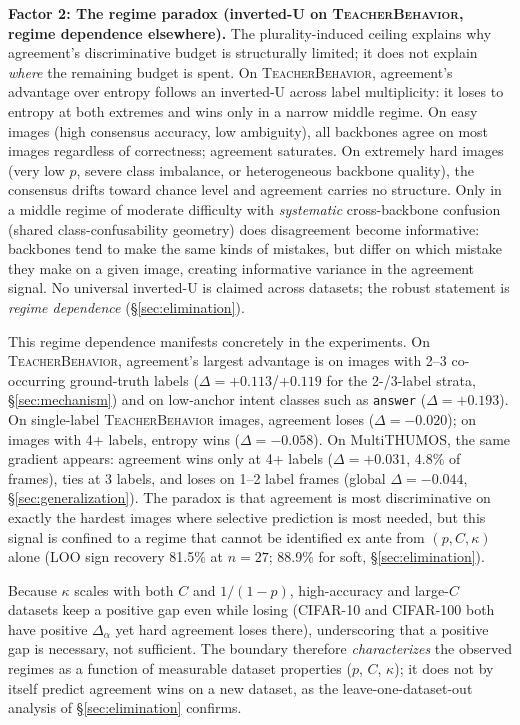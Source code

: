 \documentclass[a4paper,fleqn]{cas-sc}
\newcommand{\tb}{\textsc{TeacherBehavior}}
\begin{document}
\textbf{Factor 2: The regime paradox (inverted-U on \tb, regime dependence elsewhere).}
The plurality-induced ceiling explains why agreement's discriminative budget is structurally limited; it does not explain \emph{where} the remaining budget is spent.
On \tb, agreement's advantage over entropy follows an inverted-U across label multiplicity: it loses to entropy at both extremes and wins only in a narrow middle regime.
On easy images (high consensus accuracy, low ambiguity), all backbones agree on most images regardless of correctness; agreement saturates.
On extremely hard images (very low $p$, severe class imbalance, or heterogeneous backbone quality), the consensus drifts toward chance level and agreement carries no structure.
Only in a middle regime of moderate difficulty with \emph{systematic} cross-backbone confusion (shared class-confusability geometry) does disagreement become informative: backbones tend to make the same kinds of mistakes, but differ on which mistake they make on a given image, creating informative variance in the agreement signal.
No universal inverted-U is claimed across datasets; the robust statement is \emph{regime dependence} (\S\ref{sec:elimination}).

This regime dependence manifests concretely in the experiments.
On \tb, agreement's largest advantage is on images with 2--3 co-occurring ground-truth labels ($\Delta = +0.113$/$+0.119$ for the 2-/3-label strata, \S\ref{sec:mechanism}) and on low-anchor intent classes such as \texttt{answer} ($\Delta = +0.193$).
On single-label \tb{} images, agreement loses ($\Delta = -0.020$); on images with 4+ labels, entropy wins ($\Delta = -0.058$).
On MultiTHUMOS, the same gradient appears: agreement wins only at 4+ labels ($\Delta = +0.031$, 4.8\% of frames), ties at 3 labels, and loses on 1--2 label frames (global $\Delta = -0.044$, \S\ref{sec:generalization}).
The paradox is that agreement is most discriminative on exactly the hardest images where selective prediction is most needed, but this signal is confined to a regime that cannot be identified ex ante from $(p, C, \kappa)$ alone (LOO sign recovery 81.5\% at $n{=}27$; 88.9\% for soft, \S\ref{sec:elimination}).

Because $\kappa$ scales with both $C$ and $1/(1-p)$, high-accuracy and large-$C$ datasets keep a positive gap even while losing (CIFAR-10 and CIFAR-100 both have positive $\Delta_\alpha$ yet hard agreement loses there), underscoring that a positive gap is necessary, not sufficient. The boundary therefore \emph{characterizes} the observed regimes as a function of measurable dataset properties ($p$, $C$, $\kappa$); it does not by itself predict agreement wins on a new dataset, as the leave-one-dataset-out analysis of \S\ref{sec:elimination} confirms.
\end{document}
